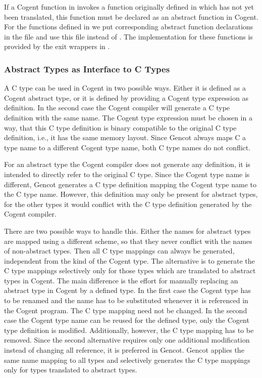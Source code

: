If a Cogent function in  invokes a function originally defined in  which has not yet
been translated, this function must be declared as an abstract function in Cogent. For the 
functions defined in  we put corresponding abstract function declarations in the file  
and use this file instead of . The implementation for these functions is provided by the
exit wrappers in .

\subsubsection{Abstract Types as Interface to C Types}

A C type can be used in Cogent in two possible ways. Either it is defined as a Cogent abstract type, or it is defined by providing
a Cogent type expression as definition. In the second case the Cogent compiler will generate a C type definition with the
same name. The Cogent type expression must be chosen in a way, that this C type definition is binary compatible to the
original C type definition, i.e., it has the same memory layout. Since Gencot always maps C a type name to a different Cogent
type name, both C type names do not conflict.

For an abstract type the Cogent compiler does not generate any definition, it is intended to directly refer to the original
C type. Since the Cogent type name is different, Gencot generates a C type definition mapping the Cogent type name to the C type name.
However, this definition may only be present for abstract types, for the other types it would conflict with the C type
definition generated by the Cogent compiler. 

There are two possible ways to handle this. Either the names for abstract types are mapped using a different scheme, so that they 
never conflict with the names of non-abstract types. Then all C type mappings can always be generated, independent from the
kind of the Cogent type. The alternative is to generate the C type mappings selectively only for those types which are
translated to abstract types in Cogent. The main difference is the effort for manually replacing an abstract type in Cogent
by a defined type. In the first case the Cogent type has to be renamed and the name has to be substituted whenever it is
referenced in the Cogent program. 
The C type mapping need not be changed. In the second case the Cogent type name can be reused for the defined type,
only the Cogent type definition is modified. Additionally, however, the C type mapping has to be removed. Since the second 
alternative requires only one additional modification instead of changing all reference, it is preferred in Gencot. Gencot
applies the same name mapping to all types and selectively generates the C type mappings only for types translated to abstract types.

